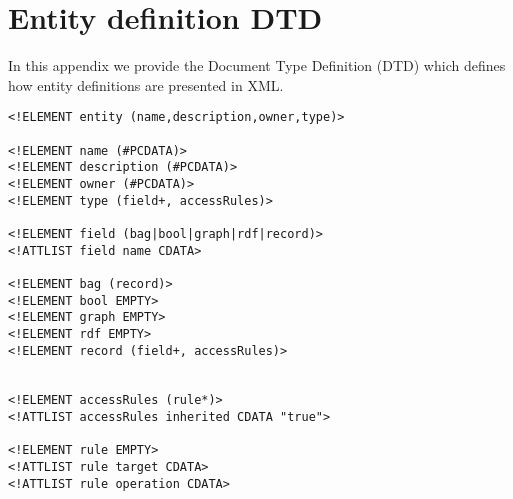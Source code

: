 
\chapter{\label{cha:dtd}Entity definition DTD}

In this appendix we provide the Document Type Definition (DTD) which defines how entity definitions are presented in XML.\\

\lstset{language=XML,basicstyle=\footnotesize\ttfamily,frame=L}
\begin{lstlisting}
<!ELEMENT entity (name,description,owner,type)>

<!ELEMENT name (#PCDATA)>
<!ELEMENT description (#PCDATA)>
<!ELEMENT owner (#PCDATA)>
<!ELEMENT type (field+, accessRules)>

<!ELEMENT field (bag|bool|graph|rdf|record)>
<!ATTLIST field name CDATA>

<!ELEMENT bag (record)>
<!ELEMENT bool EMPTY>
<!ELEMENT graph EMPTY>
<!ELEMENT rdf EMPTY>
<!ELEMENT record (field+, accessRules)>


<!ELEMENT accessRules (rule*)>
<!ATTLIST accessRules inherited CDATA "true">

<!ELEMENT rule EMPTY>
<!ATTLIST rule target CDATA>
<!ATTLIST rule operation CDATA>
\end{lstlisting}


